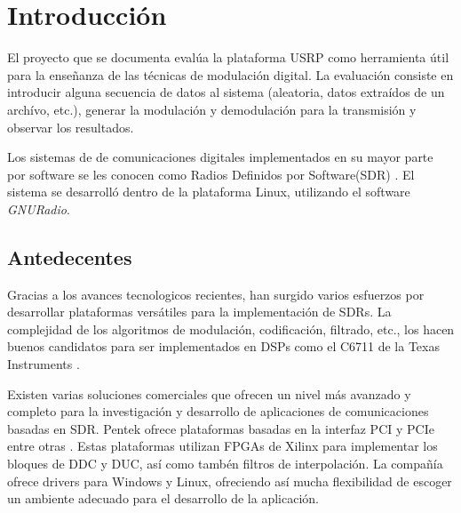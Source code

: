 \chapter{Introducci\'on}

El proyecto que se documenta eval\'ua la plataforma USRP como herramienta
\'util para la ense\~nanza de las t\'ecnicas de modulaci\'on digital. La
evaluaci\'on consiste en introducir alguna secuencia de datos al sistema
(aleatoria, datos extra\'idos de un arch\'ivo, etc.), generar la modulaci\'on y
demodulaci\'on para la transmisi\'on y observar los resultados.

Los sistemas de de comunicaciones digitales implementados en su  mayor parte por
software se les conocen como Radios Definidos por
Software(SDR) \cite{mitola}. El sistema se desarroll\'o dentro de la plataforma
Linux, utilizando el software \emph{GNURadio}.

\section{Antedecentes}

Gracias a los avances tecnologicos recientes, han surgido varios esfuerzos por
desarrollar plataformas vers\'atiles para la implementaci\'on de SDRs.
La complejidad de los algoritmos de modulaci\'on, codificaci\'on, filtrado,
etc., los hacen buenos candidatos para ser implementados en DSPs como el C6711 de la Texas
Instruments \cite{abendroth}.

Existen varias soluciones comerciales que ofrecen un nivel m\'as avanzado y
completo para la investigaci\'on y desarrollo de aplicaciones de comunicaciones
basadas en SDR. Pentek ofrece plataformas basadas en la interfaz PCI y PCIe
entre otras \cite{pentek}. Estas plataformas utilizan FPGAs de Xilinx para 
implementar los bloques de DDC y DUC, as\'i como tamb\'en filtros de interpolaci\'on. La
compa\~n\'ia ofrece drivers para Windows y Linux, ofreciendo as\'i mucha flexibilidad de
escoger un ambiente adecuado para el desarrollo de la aplicaci\'on.

